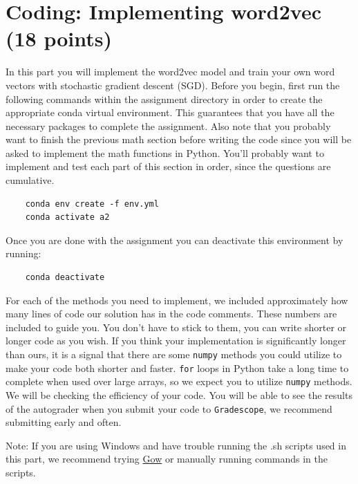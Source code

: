 \documentclass{article}
\begin{document}
    \section{Coding: Implementing word2vec (18 points)}
    In this part you will implement the word2vec model and train your own word vectors with stochastic gradient descent (SGD). Before you begin, first run the following commands within the assignment directory in order to create the appropriate conda virtual environment. This guarantees that you have all the necessary packages to complete the assignment. Also note that you probably want to finish the previous math section before writing the code since you will be asked to implement the math functions in Python. You’ll probably want to implement and test each part of this section in order, since the questions are cumulative.

    \begin{verbatim}
    conda env create -f env.yml
    conda activate a2
    \end{verbatim}

    Once you are done with the assignment you can deactivate this environment by running:
    \begin{verbatim}
    conda deactivate
    \end{verbatim}

    For each of the methods you need to implement, we included approximately how many lines of code our solution has in the code comments. These numbers are included to guide you. You don't have to stick to them, you can write shorter or longer code as you wish. If you think your implementation is significantly longer than ours, it is a signal that there are some \texttt{numpy} methods you could utilize to make your code both shorter and faster. \texttt{for} loops in Python take a long time to complete when used over large arrays, so we expect you to utilize \texttt{numpy} methods. We will be checking the efficiency of your code. You will be able to see the results of the autograder when you submit your code to \texttt{Gradescope}, we recommend submitting early and often.

    Note: If you are using Windows and have trouble running the .sh scripts used in this part, we recommend trying \href{https://github.com/bmatzelle/gow}{Gow} or manually running commands in the scripts.
\end{document}
